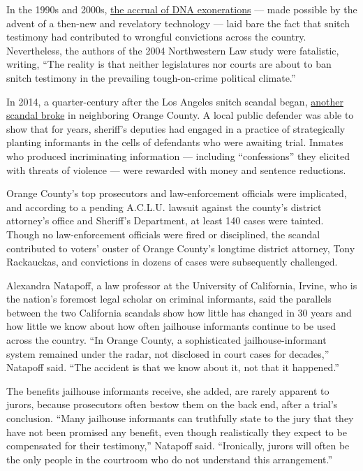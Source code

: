 In the 1990s and 2000s,
\href{https://www.law.umich.edu/special/exoneration/Pages/Exoneration-by-Year.aspx}{the
accrual of DNA exonerations} --- made possible by the advent of a
then-new and revelatory technology --- laid bare the fact that snitch
testimony had contributed to wrongful convictions across the country.
Nevertheless, the authors of the 2004 Northwestern Law study were
fatalistic, writing, ``The reality is that neither legislatures nor
courts are about to ban snitch testimony in the prevailing
tough-on-crime political climate.''

In 2014, a quarter-century after the Los Angeles snitch scandal began,
\href{http://www.abajournal.com/magazine/article/secret_snitches_california_case_uncovers_long_standing_practice_of_planting/news/article/do_you_volunteer_on_a_regular_basis/?utm_campaign=sidebar}{another
scandal broke} in neighboring Orange County. A local public defender was
able to show that for years, sheriff's deputies had engaged in a
practice of strategically planting informants in the cells of defendants
who were awaiting trial. Inmates who produced incriminating information
--- including ``confessions'' they elicited with threats of violence ---
were rewarded with money and sentence reductions.

Orange County's top prosecutors and law-​enforcement officials were
implicated, and according to a pending A.C.L.U. lawsuit against the
county's district attorney's office and Sheriff's Department, at least
140 cases were tainted. Though no law-enforcement officials were fired
or disciplined, the scandal contributed to voters' ouster of Orange
County's longtime district attorney, Tony Rackauckas, and convictions in
dozens of cases were subsequently challenged.

Alexandra Natapoff, a law professor at the University of California,
Irvine, who is the nation's foremost legal scholar on criminal
informants, said the parallels between the two California scandals show
how little has changed in 30 years and how little we know about how
often jailhouse informants continue to be used across the country. ``In
Orange County, a sophisticated jailhouse-informant system remained under
the radar, not disclosed in court cases for decades,'' Natapoff said.
``The accident is that we know about it, not that it happened.''

The benefits jailhouse informants receive, she added, are rarely
apparent to jurors, because prosecutors often bestow them on the back
end, after a trial's conclusion. ``Many jailhouse informants can
truthfully state to the jury that they have not been promised any
benefit, even though realistically they expect to be compensated for
their testimony,'' Natapoff said. ``Ironically, jurors will often be the
only people in the courtroom who do not understand this arrangement.''

